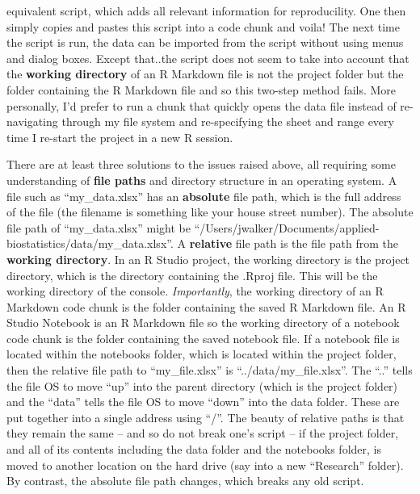 \documentclass[]{book}
\begin{document}
\begin{enumerate}
  equivalent script, which adds all relevant information for
  reproducility. One then simply copies and pastes this script into a
  code chunk and voila! The next time the script is run, the data can be
  imported from the script without using menus and dialog boxes. Except
  that..the script does not seem to take into account that the
  \textbf{working directory} of an R Markdown file is not the project
  folder but the folder containing the R Markdown file and so this
  two-step method fails. More personally, I'd prefer to run a chunk that
  quickly opens the data file instead of re-navigating through my file
  system and re-specifying the sheet and range every time I re-start the
  project in a new R session.
\end{enumerate}

There are at least three solutions to the issues raised above, all
requiring some understanding of \textbf{file paths} and directory
structure in an operating system. A file such as ``my\_data.xlsx'' has
an \textbf{absolute} file path, which is the full address of the file
(the filename is something like your house street number). The absolute
file path of ``my\_data.xlsx'' might be
``/Users/jwalker/Documents/applied-biostatistics/data/my\_data.xlsx''. A
\textbf{relative} file path is the file path from the \textbf{working
directory}. In an R Studio project, the working directory is the project
directory, which is the directory containing the .Rproj file. This will
be the working directory of the console. \emph{Importantly}, the working
directory of an R Markdown code chunk is the folder containing the saved
R Markdown file. An R Studio Notebook is an R Markdown file so the
working directory of a notebook code chunk is the folder containing the
saved notebook file. If a notebook file is located within the notebooks
folder, which is located within the project folder, then the relative
file path to ``my\_file.xlsx'' is ``../data/my\_file.xlsx''. The ``..''
tells the file OS to move ``up'' into the parent directory (which is the
project folder) and the ``data'' tells the file OS to move ``down'' into
the data folder. These are put together into a single address using
``/''. The beauty of relative paths is that they remain the same -- and
so do not break one's script -- if the project folder, and all of its
contents including the data folder and the notebooks folder, is moved to
another location on the hard drive (say into a new ``Research'' folder).
By contrast, the absolute file path changes, which breaks any old
script.
\end{document}
